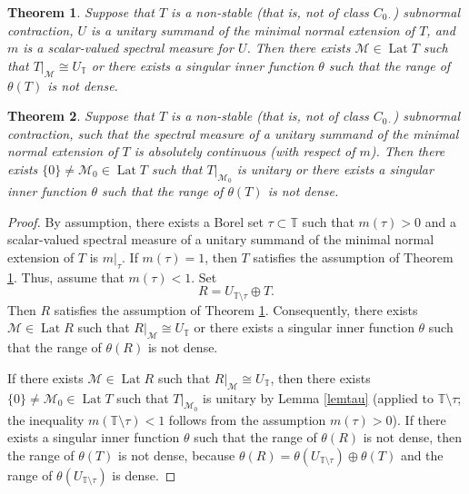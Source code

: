 \documentclass[10pt,a4paper]{amsart}
\newtheorem{theorem}{Theorem}
\begin{document}
\begin{theorem}\label{thm11} Suppose that $T$ is a non-stable (that is, not of class $C_{0\cdot}$) subnormal contraction, 
$U$ is a unitary summand of the minimal normal extension of $T$, and $m$ is a scalar-valued spectral measure for $U$. 
Then  there exists $\mathcal M\in \operatorname{Lat}T$ such that  $T|_{\mathcal M}\cong U_{\mathbb T}$ or there exists 
a singular inner function $\theta$ such that the range of $\theta(T)$ is not dense.
\end{theorem}

\begin{theorem}\label{thm12} Suppose that $T$ is a non-stable (that is, not of class $C_{0\cdot}$) subnormal contraction, such that 
the spectral measure of a unitary summand of the minimal normal extension of $T$ is absolutely continuous 
(with respect of $m$). 
Then  there exists $\{0\}\neq\mathcal M_0\in \operatorname{Lat}T$ such that  $T|_{\mathcal M_0}$ is unitary  or there exists 
a singular inner function $\theta$ such that the range of $\theta(T)$ is not dense.
\end{theorem}

\begin{proof} By assumption, there exists  a Borel set $\tau\subset\mathbb T$  such that  $m(\tau)>0$ 
and a scalar-valued spectral measure of a unitary summand of the minimal normal extension of $T$ is $m|_{\tau}$. 
If  $m(\tau)=1$, then $T$ satisfies the assumption of Theorem \ref{thm11}. Thus, assume that $m(\tau)<1$.  
Set 
\begin{equation*}R=U_{\mathbb T\setminus\tau}\oplus T.
\end{equation*}
Then $R$ satisfies the assumption of Theorem \ref{thm11}. 
Consequently,  there exists $\mathcal M\in \operatorname{Lat}R$ such that  $R|_{\mathcal M}\cong U_{\mathbb T}$ or there exists 
a singular inner function $\theta$ such that the range of $\theta(R)$ is not dense.

If there exists $\mathcal M\in \operatorname{Lat}R$ such that  $R|_{\mathcal M}\cong U_{\mathbb T}$, 
then 
there exists $\{0\}\neq\mathcal M_0\in\operatorname{Lat}T$ such that  $T|_{\mathcal M_0}$ is unitary by Lemma \ref{lemtau} 
(applied to $\mathbb T\setminus\tau$; the inequality $m(\mathbb T\setminus\tau)<1$ follows from the assumption $m(\tau)>0$). 
If there exists 
a singular inner function $\theta$ such that the range of $\theta(R)$ is not dense, then the range of $\theta(T)$ is not dense, because  $\theta(R)=\theta(U_{\mathbb T\setminus\tau})\oplus \theta(T)$ and the range of 
$\theta(U_{\mathbb T\setminus\tau})$ is dense.
\end{proof}
\end{document}
